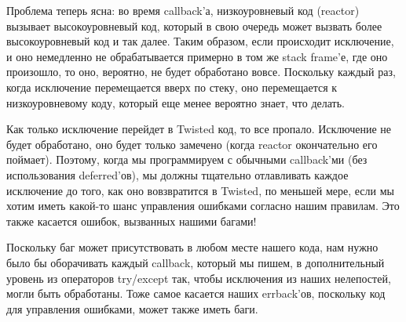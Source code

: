 Проблема теперь ясна: во время callback'а, низкоуровневый код (reactor) 
вызывает высокоуровневый код, который в свою очередь может вызвать более 
высокоуровневый код и так далее. Таким образом, если происходит исключение, и 
оно немедленно не обрабатывается примерно в том же stack frame'е, где оно 
произошло, то оно, вероятно, не будет обработано вовсе. Поскольку каждый раз, 
когда исключение перемещается вверх по стеку, оно перемещается к низкоуровневому 
коду, который еще менее вероятно знает, что делать.


Как только исключение перейдет в Twisted код, то все пропало. 
Исключение не будет обработано, оно будет только замечено (когда reactor 
окончательно его поймает). Поэтому, когда мы программируем с обычными 
callback'ми (без использования deferred'ов), мы должны тщательно 
отлавливать каждое исключение до того, как оно вовзвратится в 
Twisted, по меньшей мере, если мы хотим иметь какой-то шанс управления 
ошибками согласно нашим правилам. Это также касается ошибок, вызванных  
нашими багами!


Поскольку баг может присутствовать в любом месте нашего кода, нам нужно было 
бы оборачивать каждый callback, который мы пишем, в дополнительный уровень 
из операторов try/except так, чтобы исключения из наших нелепостей, могли 
быть обработаны.  Тоже самое касается наших errback'ов, поскольку код для 
управления ошибками, может также иметь баги. 


